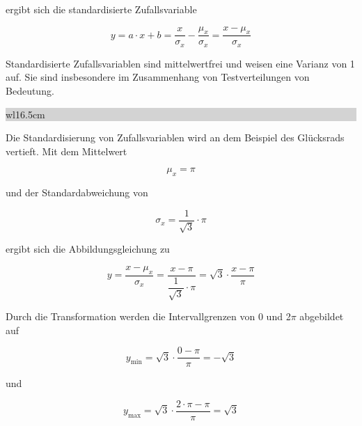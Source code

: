 \noindent ergibt sich die standardisierte Zufallsvariable

\begin{equation}\label{eq:fourhundredtwo}
y=a\cdot x+b=\dfrac{x}{\sigma _{x} } -\dfrac{\mu _{x}}{\sigma _{x}} =\dfrac{x-\mu _{x}}{\sigma _{x}}
\end{equation}

\noindent Standardisierte Zufallsvariablen sind mittelwertfrei und weisen eine Varianz von 1 auf. Sie sind insbesondere im Zusammenhang von Testverteilungen von Bedeutung.\bigskip

\noindent
\colorbox{lightgray}{%
%
\renewcommand\arraystretch{0.6}%
\begin{tabular}{ wl{16.5cm} }
{}
\end{tabular}%
}\medskip 

\noindent Die Standardisierung von Zufallsvariablen wird an dem Beispiel des Gl\"{u}cksrads vertieft. Mit dem Mittelwert 

\begin{equation}\label{eq:fourhundredthree}
\mu _{x} =\pi 
\end{equation}

\noindent und der Standardabweichung von 

\begin{equation}\label{eq:fourhundredfour}
\sigma _{x} =\dfrac{1}{\sqrt{3}} \cdot \pi
\end{equation}

\noindent ergibt sich die Abbildungsgleichung zu

\begin{equation}\label{eq:fourhundredfive}
y=\dfrac{x-\mu _{x}}{\sigma _{x}} =\dfrac{x-\pi}{\dfrac{1}{\sqrt{3}} \cdot \pi } =\sqrt{3} \cdot \dfrac{x-\pi}{\pi}
\end{equation}

\noindent Durch die Transformation werden die Intervallgrenzen von 0 und 2$\pi$ abgebildet auf

\begin{equation}\label{eq:fourhundredsix}
y_{\min } =\sqrt{3} \cdot \dfrac{0-\pi}{\pi} =-\sqrt{3}
\end{equation}

\noindent und 

\begin{equation}\label{eq:fourhundredseven}
y_{\max} =\sqrt{3} \cdot \dfrac{2\cdot \pi -\pi}{\pi} =\sqrt{3}
\end{equation}

